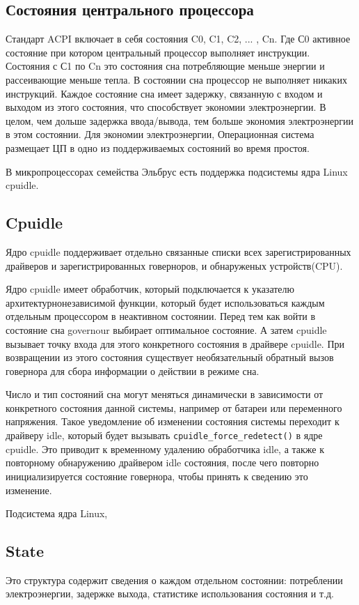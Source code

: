 \documentclass{article}
\begin{document}
\subsection{Состояния центрального процессора}

Стандарт ACPI включает в себя состояния C0, C1, C2, ... , Cn. Где С0 активное состояние при котором центральный процессор выполняет инструкции. Состояния с С1 по Cn это состояния сна потребляющие меньше энергии и рассеивающие меньше тепла. В состоянии сна процессор не выполняет никаких инструкций. Каждое состояние сна имеет задержку, связанную с входом и выходом из этого состояния, что способствует экономии электроэнергии. В целом, чем дольше задержка ввода/вывода, тем больше экономия электроэнергии в этом состоянии. Для экономии электроэнергии, Операционная система размещает ЦП в одно из поддерживаемых состояний во время простоя.

В микропроцессорах семейства Эльбрус есть поддержка подсистемы ядра Linux cpuidle.


\subsection{Cpuidle}
Ядро cpuidle поддерживает отдельно связанные списки всех зарегистрированных драйверов и зарегистрированных говерноров, и обнаруженых устройств(CPU).

Ядро cpuidle имеет обработчик, который подключается к указателю архитектурнонезависимой функции, который будет использоваться каждым отдельным процессором в неактивном состоянии. Перед тем как войти в состояние сна governour выбирает оптимальное состояние. А затем cpuidle вызывает точку входа для этого конкретного состояния в драйвере cpuidle. При возвращении из этого состояния существует необязательный обратный вызов говернора для сбора информации о действии в режиме сна.

Число и тип состояний сна могут меняться динамически в зависимости от конкретного состояния данной системы, например от батареи или переменного напряжения. Такое уведомление об изменении состояния системы переходит к драйверу idle, который будет вызывать 
\texttt{cpuidle\_force\_redetect()} в ядре cpuidle. Это приводит к временному удалению обработчика idle, а также к повторному обнаружению драйвером idle состояния, после чего повторно инициализируется состояние говернора, чтобы принять к сведению это изменение.

Подсистема ядра Linux, 

\subsection{State}
Это структура содержит сведения о каждом отдельном состоянии: потреблении электроэнергии, задержке выхода, статистике использования состояния и т.д.

\end{document}
